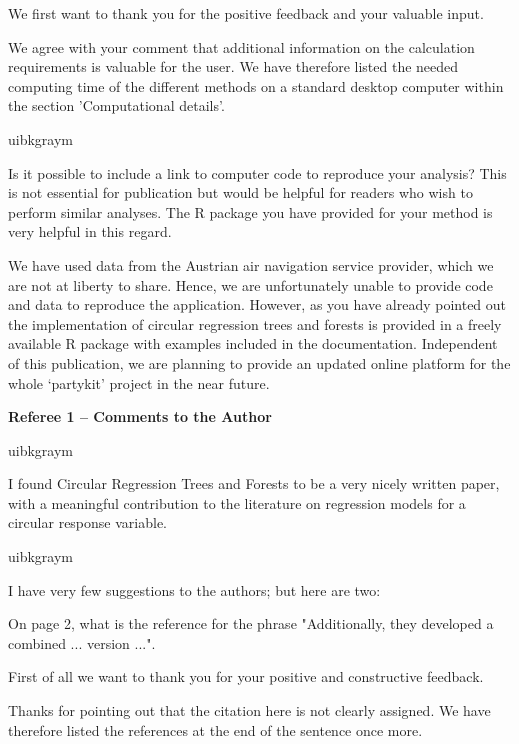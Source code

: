 \documentclass[english, noconfig]{uibklttr}
\newcommand{\section}[1]{{\Large{\textbf{#1}}}}
\newenvironment{re}{
    \begin{color}{uibkgraym}
        \itshape
}{
    \end{color}
}
\begin{document}
We first want to thank you for the positive feedback and your valuable input. 

We agree with your comment that additional information on the calculation
requirements is valuable for the user. We have therefore listed the needed
computing time of the different methods on a standard desktop computer within
the section 'Computational details'.

\vspace{0.5em}
\begin{re}
Is it possible to include a link to computer code to reproduce your
analysis? This is not essential for publication but would be helpful for
readers who wish to perform similar analyses. The R package you have provided
for your method is very helpful in this regard.  
\end{re}

We have used data from the Austrian air navigation service provider, which
we are not at liberty to share. Hence, we are unfortunately unable to provide
code and data to reproduce the application. However, as you have already
pointed out the implementation of circular regression trees and forests is
provided in a freely available R package with examples included in the documentation.
Independent of this publication, we are planning to provide an updated online
platform for the whole `partykit' project in the near future.

\newpage

\section{Referee 1 -- Comments to the Author}

\begin{re}
I found Circular Regression Trees and Forests to be a very nicely written
paper, with a meaningful contribution to the literature on regression models
for a circular response variable. 
\end{re}

\begin{re}
I have very few suggestions to the authors; but here are two:

On page 2, what is the reference for the phrase "Additionally, they
developed a combined ... version ...".
\end{re}

First of all we want to thank you for your positive and constructive feedback.

Thanks for pointing out that the citation here is not clearly assigned. We have therefore
listed the references at the end of the sentence once more.
\end{document}
